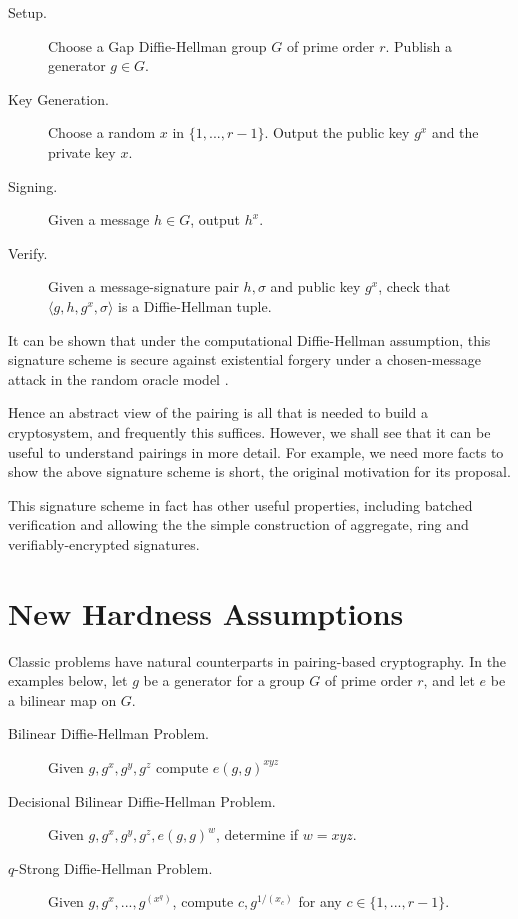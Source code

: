 \begin{description}
\item[Setup.]
Choose a Gap Diffie-Hellman group $G$ of prime order $r$.
Publish a generator $g \in G$.

\item[Key Generation.]
Choose a random $x$ in $\{1,...,r-1\}$. Output
the public key $g^x$ and the private key $x$.

\item[Signing.]
Given a message $h \in G$, output $h^x$.

\item[Verify.]
Given a message-signature pair $h, \sigma$ and public key $g^x$,
check that $\langle{ g, h, g^x, \sigma}\rangle$ is a Diffie-Hellman tuple.
\end{description}

It can be shown that under the computational Diffie-Hellman assumption,
this signature scheme is secure against existential
forgery under a chosen-message attack in the random oracle model \cite{bls}.

Hence an abstract view of the pairing is all that is needed to build a
cryptosystem, and frequently this suffices. However,
we shall see that it can be useful to understand pairings in more detail.
For example, we need more facts to show the above signature scheme is
short, the original motivation for its proposal.

This signature scheme in fact has other useful properties, including
batched verification and allowing the
the simple construction of aggregate, ring and verifiably-encrypted
signatures\cite{bgls}.

\section{New Hardness Assumptions}

Classic problems have natural counterparts in pairing-based
cryptography. In the examples below, let $g$ be a generator
for a group $G$ of prime order $r$, and let $e$ be a bilinear map
on $G$.

\begin{description}
\item [Bilinear Diffie-Hellman Problem.]
Given $g,g^x,g^y,g^z$ compute $e(g,g)^{xyz}$
\item [Decisional Bilinear Diffie-Hellman Problem.]
Given $g,g^x,g^y,g^z,e(g,g)^w$, determine if $w = x y z$.
\item [$q$-Strong Diffie-Hellman Problem.]
Given $g,g^x,...,g^{(x^q)}$, compute $c, g^{1/(x_c)}$
for any $c\in\{1,...,r-1\}$.
\end{description}

